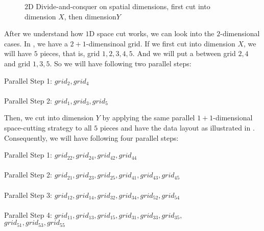 {

\begin{figure}[ht]
\centering
{}
\caption{$2$D Divide-and-conquer on spatial dimensions, first cut into dimension $X$, then dimension$Y$}
\label{fig:2DSpatialCut}
\end{figure}

After we understand how $1$D space cut works, we can look
into the $2$-dimensional cases. In , we have a $2+1$-dimensinoal
grid. If we first cut into dimension $X$, we will have $5$ pieces,
that is, grid $1, 2, 3, 4, 5$. And we will put a  between
grid $2, 4$ and grid $1, 3, 5$. So we will have following two parallel
steps:

\begin{codebox}
Parallel Step 1:  $grid_2, grid_4$ \\
 \\
Parallel Step 2:  $grid_1, grid_3, grid_5$ 
\end{codebox}

Then, we cut into dimension $Y$ by applying the same parallel $1+1$-dimensional
space-cutting strategy to all $5$ pieces and have the data
layout as illustrated in . Consequently, we will have
following four parallel steps:

\begin{codebox}
Parallel Step 1:  $grid_{22}, grid_{24}, grid_{42}, grid_{44}$ \\
 \\
Parallel Step 2:  $grid_{21}, grid_{23}, grid_{25}, grid_{41}, grid_{43}, grid_{45}$ \\
 \\
Parallel Step 3:  $grid_{12}, grid_{14}, grid_{32}, grid_{34}, grid_{52}, grid_{54}$ \\
 \\
Parallel Step 4:  $grid_{11}, grid_{13}, grid_{15}, grid_{31}, grid_{33}, grid_{35},$ \\
$grid_{51}, grid_{53}, grid_{55}$ \\
\end{codebox}

}
